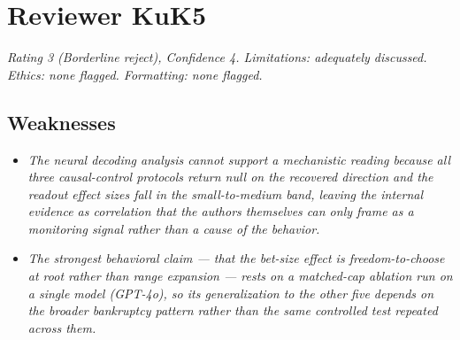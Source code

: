 
\section*{Reviewer KuK5}

\noindent\textit{Rating 3 (Borderline reject), Confidence 4. Limitations: adequately discussed.
Ethics: none flagged. Formatting: none flagged.}

\subsection*{Weaknesses}

\begin{itemize}
\item[\textbf{W1.}] \itshape The neural decoding analysis cannot support a mechanistic reading
because all three causal-control protocols return null on the recovered direction and the readout
effect sizes fall in the small-to-medium band, leaving the internal evidence as correlation that
the authors themselves can only frame as a monitoring signal rather than a cause of the behavior.
\end{itemize}


\begin{itemize}
\item[\textbf{W2.}] \itshape The strongest behavioral claim --- that the bet-size effect is
freedom-to-choose at root rather than range expansion --- rests on a matched-cap ablation run on a
single model (GPT-4o), so its generalization to the other five depends on the broader bankruptcy
pattern rather than the same controlled test repeated across them.
\end{itemize}



